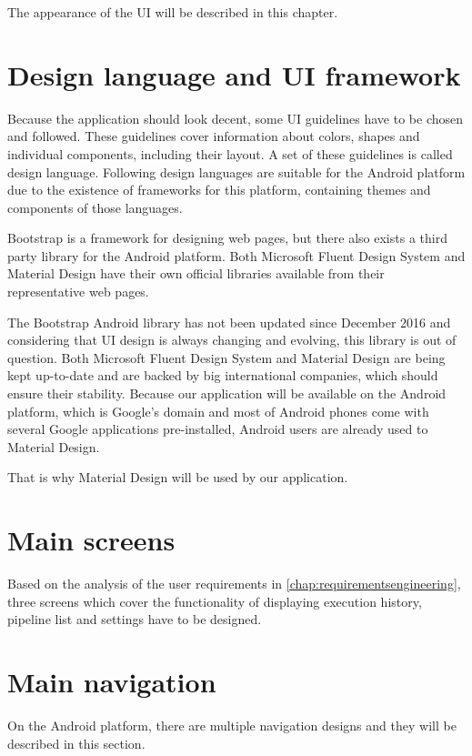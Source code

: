 The appearance of the UI will be described in this chapter.

\section{Design language and UI framework}
Because the application should look decent, some UI guidelines have to be chosen and followed.
These guidelines cover information about colors, shapes and individual components, including their layout.
A set of these guidelines is called design language.
Following design languages are suitable for the Android platform due to the existence of frameworks for this platform, containing themes and components of those languages.

Bootstrap \cite{bootstrap} is a framework for designing web pages, but there also exists a third party library \cite{androidbootstrap} for the Android platform.
Both Microsoft Fluent Design System \cite{fluentui} and Material Design \cite{materialandroid} have their own official libraries available from their representative web pages.

The Bootstrap Android library has not been updated since December 2016 and considering that UI design is always changing and evolving, this library is out of question.
Both Microsoft Fluent Design System and Material Design are being kept up-to-date and are backed by big international companies, which should ensure their stability.
Because our application will be available on the Android platform, which is Google's domain and most of Android phones come with several Google applications pre-installed, Android users are already used to Material Design.

That is why Material Design will be used by our application.

\section{Main screens}
Based on the analysis of the user requirements in \autoref{chap:requirementsengineering}, three screens which cover the functionality of displaying execution history, pipeline list and settings have to be designed.

\section{Main navigation}
On the Android platform, there are multiple navigation designs and they will be described in this section.

